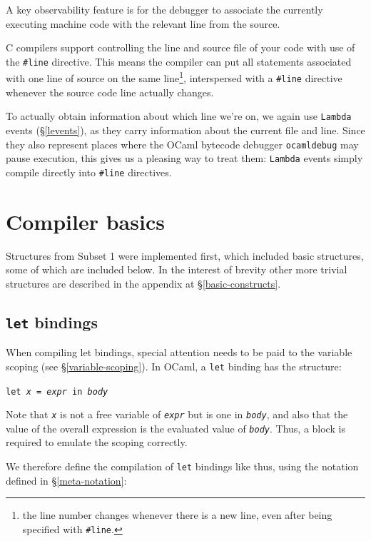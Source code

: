 A key observability feature is for the debugger to associate the currently
executing machine code with the relevant line from the source.

C compilers support controlling the line and source file of your code with use
of the \texttt{\#}\texttt{line} directive. This means the compiler can put all
statements associated with one line of source on the same line\footnote{the line
    number changes whenever there is a new line, even after being specified with
\texttt{\#}\texttt{line}.}, interspersed with a \verb|#line| directive whenever
the source code line actually changes.

To actually obtain information about which line we're on, we again use
\texttt{Lambda} events (\S\ref{levents}), as they carry information about the
current file and line. Since they also represent places where the OCaml bytecode
debugger \texttt{ocamldebug} may pause execution, this gives us a pleasing way
to treat them: \texttt{Lambda} events simply compile directly into \verb|#line|
directives.

\section{Compiler basics} \label{compiler-basics}

Structures from Subset 1 were implemented first, which included basic
structures, some of which are included below. In the interest of brevity other
more trivial structures are described in the appendix at
\S\ref{basic-constructs}.

\subsection{\texttt{let} bindings}

When compiling let bindings, special attention needs to be paid to the variable
scoping (see \S\ref{variable-scoping}). In OCaml, a \texttt{let} binding has the
structure:

\begin{center}
    \texttt{let \emph{x} = \emph{expr} in \emph{body}}
\end{center}

Note that \texttt{\emph{x}} is not a free variable of \texttt{\emph{expr}} 
but is one in \texttt{\emph{body}}, and also that the value of the overall 
expression is the evaluated value of \texttt{\emph{body}}. Thus, a block is 
required to emulate the scoping correctly.

We therefore define the compilation of \texttt{let} bindings like thus, using
the notation defined in \S\ref{meta-notation}:

